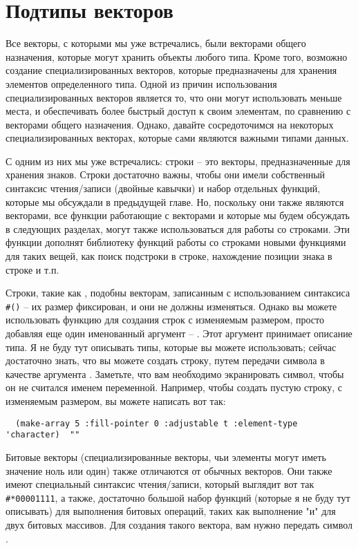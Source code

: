 \section{Подтипы векторов}

Все векторы, с которыми мы уже встречались, были векторами общего назначения, которые
могут хранить объекты любого типа.  Кроме того, возможно создание специализированных
векторов, которые предназначены для хранения элементов определенного типа.  Одной из
причин использования специализированных векторов является то, что они могут использовать
меньше места, и обеспечивать более быстрый доступ к своим элементам, по сравнению с
векторами общего назначения.  Однако, давайте сосредоточимся на некоторых
специализированных векторах, которые сами являются важными типами данных.

С одним из них мы уже встречались: строки -- это векторы, предназначенные для хранения
знаков.  Строки достаточно важны, чтобы они имели собственный синтаксис чтения/записи
(двойные кавычки) и набор отдельных функций, которые мы обсуждали в предыдущей главе.  Но,
поскольку они также являются векторами, все функции работающие с векторами и которые мы
будем обсуждать в следующих разделах, могут также использоваться для работы со строками.
Эти функции дополнят библиотеку функций работы со строками новыми функциями для таких
вещей, как поиск подстроки в строке, нахождение позиции знака в строке и т.п.

Строки, такие как , подобны векторам, записанным с использованием синтаксиса
\lstinline!#()! -- их размер фиксирован, и они не должны изменяться.  Однако вы можете
использовать функцию  для создания строк с изменяемым размером, просто
добавляя еще один именованный аргумент -- .  Этот аргумент принимает
описание типа.  Я не буду тут описывать типы, которые вы можете использовать; сейчас
достаточно знать, что вы можете создать строку, путем передачи символа  в
качестве аргумента .  Заметьте, что вам необходимо экранировать
символ, чтобы он не считался именем переменной.  Например, чтобы создать пустую строку, с
изменяемым размером, вы можете написать вот так:

\begin{verbatim}
  (make-array 5 :fill-pointer 0 :adjustable t :element-type 'character)  ""
\end{verbatim}

Битовые векторы (специализированные векторы, чьи элементы могут иметь значение ноль или
один) также отличаются от обычных векторов.  Они также имеют специальный синтаксис
чтения/записи, который выглядит вот так \lstinline!#*00001111!, а также, достаточно большой
набор функций (которые я не буду тут описывать) для выполнения битовых операций, таких как
выполнение "и" для двух битовых массивов.  Для создания такого вектора, вам нужно передать
 символ .

